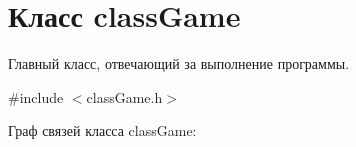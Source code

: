 \hypertarget{classclassGame}{}\section{Класс class\+Game}
\label{classclassGame}


Главный класс, отвечающий за выполнение программы.  




{\ttfamily \#include $<$class\+Game.\+h$>$}



Граф связей класса class\+Game\+:
